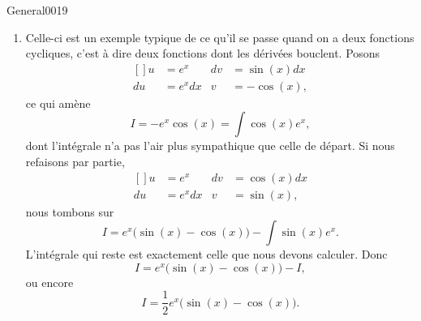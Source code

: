 \begin{corrige}{General0019}
\begin{enumerate}
\item
Celle-ci est un exemple typique de ce qu'il se passe quand on a deux fonctions \og cycliques\fg, c'est à dire deux fonctions dont les dérivées bouclent. Posons
\begin{equation}
	\begin{aligned}[]
		u&=e^x		&	dv&=\sin(x)dx\\
		du&=e^xdx	&	v&=-\cos(x),
	\end{aligned}
\end{equation}
ce qui amène
\begin{equation}
	I=-e^x\cos(x)=\int\cos(x)e^x,
\end{equation}
dont l'intégrale n'a pas l'air plus sympathique que celle de départ. Si nous refaisons par partie,
\begin{equation}
	\begin{aligned}[]
		u&=e^x		&	dv&=\cos(x)dx\\
		du&=e^xdx	&	v&=\sin(x),
	\end{aligned}
\end{equation}
nous tombons sur
\begin{equation}
	I=e^x\big( \sin(x)-\cos(x) \big)-\int\sin(x)e^x.
\end{equation}
L'intégrale qui reste est exactement celle que nous devons calculer. Donc
\begin{equation}
	I=e^x\big( \sin(x)-\cos(x) \big)-I,
\end{equation}
ou encore
\begin{equation}
	I=\frac{1}{ 2 }e^x\big( \sin(x)-\cos(x) \big).
\end{equation}

\end{enumerate}


\end{corrige}

